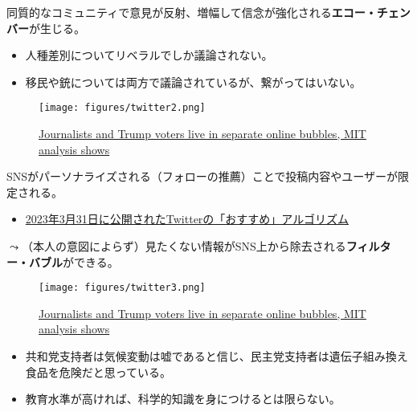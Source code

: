 \documentclass[
  xelatex,
  ja=standard]{bxjsarticle}
\providecommand{\tightlist}{%
  \setlength{\itemsep}{0pt}\setlength{\parskip}{0pt}}\usepackage{longtable,booktabs,array}
\begin{document}
同質的なコミュニティで意見が反射、増幅して信念が強化される\textbf{エコー・チェンバー}が生じる。

\begin{itemize}
\tightlist
\item
  人種差別についてリベラルでしか議論されない。
\item
  移民や銃については両方で議論されているが、繋がってはいない。
\end{itemize}

\begin{figure}[htpb]

{\centering \texttt{[image: figures/twitter2.png]}

}

\caption{\href{https://www.vice.com/en/article/d3xamx/journalists-and-trump-voters-live-in-separate-online-bubbles-mit-analysis-shows}{Journalists
and Trump voters live in separate online bubbles, MIT analysis shows}}

\end{figure}

SNSがパーソナライズされる（フォローの推薦）ことで投稿内容やユーザーが限定される。

\begin{itemize}
\tightlist
\item
  \href{https://gigazine.net/news/20230403-twitter-recommend-algorithm/}{2023年3月31日に公開されたTwitterの「おすすめ」アルゴリズム}
\end{itemize}

\(\leadsto\)（本人の意図によらず）見たくない情報がSNS上から除去される\textbf{フィルター・バブル}ができる。

\begin{figure}[htpb]

{\centering \texttt{[image: figures/twitter3.png]}

}

\caption{\href{https://www.vice.com/en/article/d3xamx/journalists-and-trump-voters-live-in-separate-online-bubbles-mit-analysis-shows}{Journalists
and Trump voters live in separate online bubbles, MIT analysis shows}}

\end{figure}

\begin{itemize}
\tightlist
\item
  共和党支持者は気候変動は嘘であると信じ、民主党支持者は遺伝子組み換え食品を危険だと思っている。
\item
  教育水準が高ければ、科学的知識を身につけるとは限らない。
\end{itemize}
\end{document}
